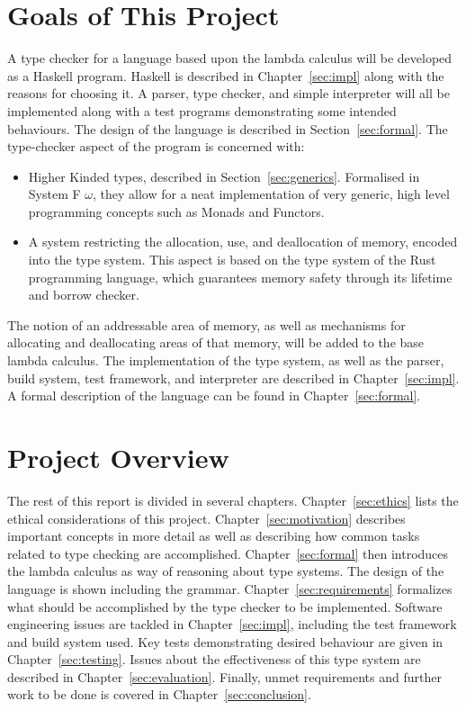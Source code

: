 \section{Goals of This Project}
A type checker for a language based upon the lambda calculus will be developed
as a Haskell program. Haskell is described in Chapter~\ref{sec:impl} along
with the reasons for choosing it. A parser, type checker, and simple
interpreter will all be implemented along with a test programs demonstrating
some intended behaviours. The design of the language is described in
Section~\ref{sec:formal}.  The type-checker aspect of the program is concerned
with:
\begin{itemize}
    \item Higher Kinded types, described in Section~\ref{sec:generics}.
        Formalised in System F $\omega$, they allow for a neat implementation of
        very generic, high level programming concepts such as Monads and
        Functors.
    \item A system restricting the allocation, use, and deallocation of memory,
        encoded into the type system. This aspect is based on the type system
        of the Rust programming language, which guarantees memory safety through
        its lifetime and borrow checker.
\end{itemize}
The notion of an addressable area of memory, as well as mechanisms for
allocating and deallocating areas of that memory, will be added to the base
lambda calculus.  The implementation of the type system, as well as the parser,
build system, test framework, and interpreter are described in
Chapter~\ref{sec:impl}. A formal description of the language can be found in
Chapter~\ref{sec:formal}.

\section{Project Overview}
The rest of this report is divided in several chapters. Chapter~\ref{sec:ethics}
lists the ethical considerations of this project. Chapter~\ref{sec:motivation}
describes important concepts in more detail as well as describing how common tasks
related to type checking are accomplished. Chapter~\ref{sec:formal} then introduces the
lambda calculus as way of reasoning about type systems. The design of the language
is shown including the grammar. Chapter~\ref{sec:requirements} formalizes what
should be accomplished by the type checker to be implemented. Software engineering
issues are tackled in Chapter~\ref{sec:impl}, including the test framework and
build system used. Key tests demonstrating desired behaviour are given in
Chapter~\ref{sec:testing}. Issues about the effectiveness of this type system
are described in Chapter~\ref{sec:evaluation}. Finally, unmet requirements and
further work to be done is covered in Chapter~\ref{sec:conclusion}.
